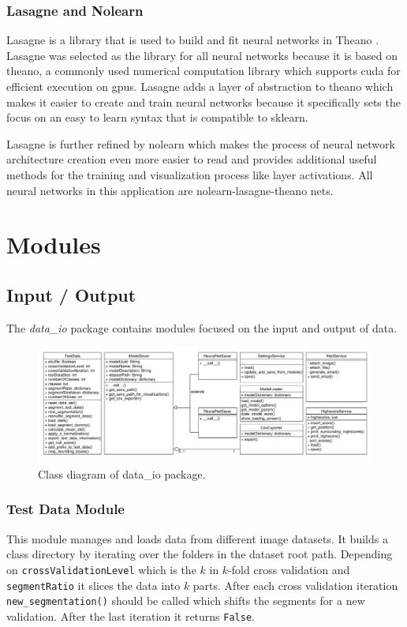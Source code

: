 		\subsubsection*{Lasagne and Nolearn}
		Lasagne is a library that is used to build and fit neural networks in Theano \cite{Dieleman2015}. Lasagne was selected as the library for all neural networks because it is based on theano, a commonly used numerical computation library which supports \gls{cuda} for efficient execution on \glspl{gpu}. Lasagne adds a layer of abstraction to theano which makes it easier to create and train neural networks because it specifically sets the focus on an easy to learn syntax that is compatible to sklearn.
		
		Lasagne is further refined by nolearn which makes the process of neural network architecture creation even more easier to read and provides additional useful methods for the training and visualization process like layer activations. All neural networks in this application are nolearn-lasagne-theano nets. 
		

\section{Modules}
\label{sec:modules}

	\subsection{Input / Output}
	The \textit{data\_io} package contains modules focused on the input and output of data.
	\begin{figure}
		\centering
		\includegraphics[width=\linewidth]{figures/implementation_dataIO}		
		\caption{Class diagram of data\_io package.}
		\label{fig:dataIO}
	\end{figure}
	
		\subsubsection*{Test Data Module}
		This module manages and loads data from different image datasets. It builds a class directory by iterating over the folders in the dataset root path. Depending on \verb|crossValidationLevel| which is the $k$ in $k$-fold cross validation and \verb|segmentRatio| it slices the data into $k$ parts. After each cross validation iteration \verb|new_segmentation()| should be called which shifts the segments for a new validation. After the last iteration it returns \verb|False|. 
		
